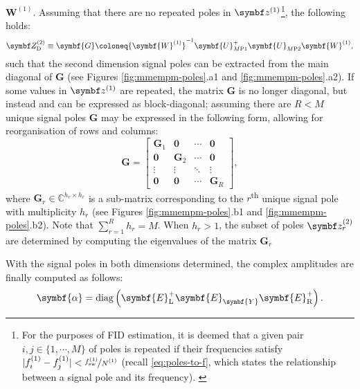 $\symbf{W}^{(1)}$. Assuming that there are no repeated poles in
$\bdzone$\footnote{
    For the purposes of \ac{FID} estimation, it is deemed that a given pair
    $i,j \in \lbrace 1, \cdots, M \rbrace$ of poles is repeated if their
    frequencies satisfy $\lvert \fone_i - \fone_j \rvert <
    \nicefrac{\fswone}{\None}$ (recall \cref{eq:poles-to-f}, which states the
    relationship between a signal pole and its frequency).
    \label{fn:similar-freqs}
}, the following holds:
\begin{equation}
    \bdZtwo_{\text{D}} \equiv \symbf{G} \coloneq
        {\symbf{W}^{(1)}}^{-1}
        \symbf{U}_{M\text{P}1}^+
        \symbf{U}_{M\text{P}2}^{\vphantom{+}}
        \symbf{W}^{(1)},
        \label{eq:G}%
\end{equation}
such that the second dimension signal poles can be extracted from the main
diagonal of $\symbf{G}$ (see Figures \ref{fig:mmempm-poles}.a1 and
\ref{fig:mmempm-poles}.a2).
If some values in $\bdzone$ are repeated, the matrix $\symbf{G}$ is
no longer diagonal, but instead and can be expressed as block-diagonal;
assuming there are $R < M$ unique signal poles $\symbf{G}$ may be expressed in
the following form, allowing for reorganisation of rows and columns:
\begin{equation}
    \symbf{G} =
    \begin{bmatrix}
        \symbf{G}_1 & \symbf{0} & \cdots & \symbf{0} \\
        \symbf{0} & \symbf{G}_2 & \cdots & \symbf{0} \\
        \vdots & \vdots & \ddots & \vdots \\
        \symbf{0} & \symbf{0} & \cdots & \symbf{G}_R
    \end{bmatrix},
    \label{eq:block-G}%
\end{equation}%
where $\symbf{G}_r \in \mathbb{C}^{h_r \times h_r}$ is a sub-matrix corresponding
to the $r$\textsuperscript{th} unique signal pole with multiplicity $h_r$ (see
Figures \ref{fig:mmempm-poles}.b1 and \ref{fig:mmempm-poles}.b2). Note that
$\sum_{r=1}^R h_r = M$.  When $h_r > 1$, the subset of poles $\bdztwo_r$ are
determined by computing the eigenvalues of the matrix $\symbf{G}_r$

With the signal poles in both dimensions determined, the complex amplitudes are
finally computed as follows:
\begin{equation}
    \symbf{\alpha} = \diag \left( \symbf{E}_{\text{L}}^+ \symbf{E}_{\symbf{Y}}^{\vphantom{+}} \symbf{E}_{\text{R}}^+ \right).
    \label{eq:complex-amplitudes-2d}%
\end{equation}


